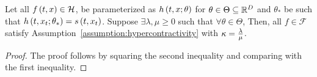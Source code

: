 \begin{lemma}\label{lemma:hypercontractivity}
    Let all $f\left(t, x\right) \in \mathcal{H}$, be parameterized as $h\left(t, x;\theta\right)$ for $\theta \in \Theta \subseteq \mathbb{R}^D$ and $\theta_{*}$ be such that $h\left(t, x_{t}; \theta_{*}\right) = s\left(t, x_{t}\right)$. Suppose $\exists \lambda,\mu \geq 0$ such that $\forall \theta \in \Theta$, 
Then, all $f \in \mathcal{F}$ satisfy Assumption~\ref{assumption:hypercontractivity} with $\kappa = \frac{\lambda}{\mu}$.
\end{lemma}
\begin{proof}
    The proof follows by squaring the second inequality and comparing with the first inequality.
\end{proof}


